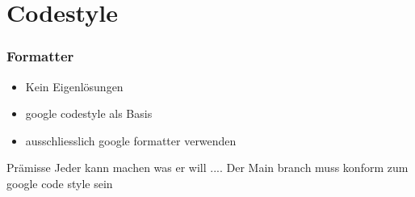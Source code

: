 \section{Codestyle}
\begin{frame}
  \frametitle{Formatter}
  \begin{itemize}
  \item Kein Eigenlösungen
  \item google codestyle als Basis
  \item ausschliesslich google formatter verwenden
  \end{itemize}
  \begin{block}{Prämisse}
    Jeder kann machen was er will .... Der Main branch muss konform zum google code style sein
    \end{block}
\end{frame}